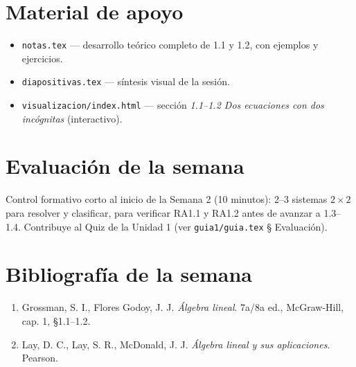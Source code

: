\documentclass[11pt,letterpaper]{article}
\begin{document}
\section{Material de apoyo}

\begin{itemize}[leftmargin=1.2cm]
  \item \texttt{notas.tex} --- desarrollo teórico completo de 1.1 y 1.2, con ejemplos y ejercicios.
  \item \texttt{diapositivas.tex} --- síntesis visual de la sesión.
  \item \texttt{visualizacion/index.html} --- sección \emph{1.1--1.2 Dos ecuaciones con dos
        incógnitas} (interactivo).
\end{itemize}

\section{Evaluación de la semana}

Control formativo corto al inicio de la Semana 2 (10 minutos): 2--3 sistemas $2\times 2$ para
resolver y clasificar, para verificar RA1.1 y RA1.2 antes de avanzar a 1.3--1.4. Contribuye al
Quiz de la Unidad 1 (ver \texttt{guia1/guia.tex} § Evaluación).

\section{Bibliografía de la semana}

\begin{enumerate}[leftmargin=1.2cm]
  \item Grossman, S. I., Flores Godoy, J. J. \emph{Álgebra lineal}. 7a/8a ed., McGraw-Hill,
        cap. 1, §1.1--1.2.
  \item Lay, D. C., Lay, S. R., McDonald, J. J. \emph{Álgebra lineal y sus aplicaciones}. Pearson.
\end{enumerate}
\end{document}
